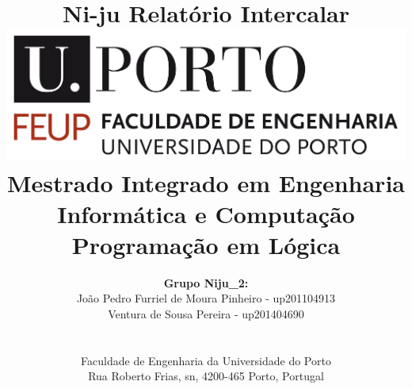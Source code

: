 \documentclass[a4paper]{article}
\begin{document}
\setlength{\textwidth}{16cm}
\setlength{\textheight}{22cm}

\title{\Huge\textbf{Ni-ju}\linebreak\linebreak\linebreak
\Large\textbf{Relatório Intercalar}\linebreak\linebreak
\linebreak\linebreak
\includegraphics[scale=0.1]{../printscreens/feup-logo.png}\linebreak\linebreak
\linebreak\linebreak
\Large{Mestrado Integrado em Engenharia Informática e Computação} \linebreak\linebreak
\Large{Programação em Lógica}\linebreak
}

\author{\textbf{Grupo Niju\_2:}\\
João Pedro Furriel de Moura Pinheiro - up201104913\\
Ventura de Sousa Pereira - up201404690\\
\linebreak\linebreak \\
 \\ Faculdade de Engenharia da Universidade do Porto \\ Rua Roberto Frias, s\/n, 4200-465 Porto, Portugal \linebreak\linebreak\linebreak
\linebreak\linebreak\vspace{1cm}}

\maketitle
\thispagestyle{empty}
\end{document}
